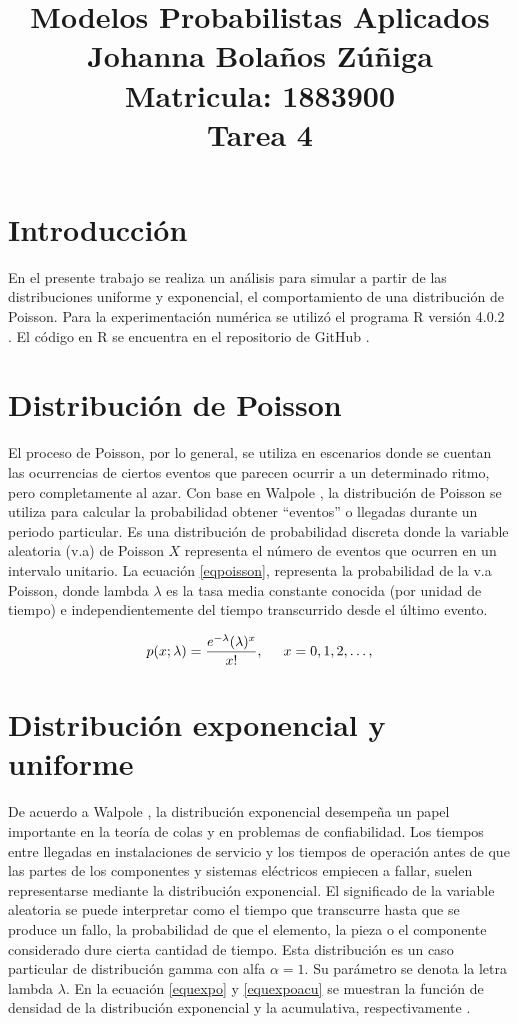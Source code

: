 \documentclass{article}
\title{
\centering
Modelos Probabilistas Aplicados \\
Johanna Bolaños Zúñiga \\
Matricula: 1883900\\
Tarea 4
}
\date{}
\begin{document}
\maketitle

\section{Introducción}
En el presente trabajo se realiza un análisis para simular a partir de las distribuciones uniforme y exponencial, el comportamiento de una distribución de Poisson. Para la experimentación numérica se utilizó el programa R versión 4.0.2 \cite{r}. El código en R se encuentra en el repositorio de GitHub \cite{github}.

\section{Distribución de Poisson} \label{poisson}
El proceso de Poisson, por lo general, se utiliza en escenarios donde se cuentan las ocurrencias de ciertos eventos que parecen ocurrir a un determinado ritmo, pero completamente al azar. Con base en Walpole \cite{walpole}, la distribución de Poisson se utiliza para calcular la probabilidad obtener ``eventos” o llegadas durante un periodo particular. Es una distribución de probabilidad discreta donde la variable aleatoria (v.a) de Poisson $X$ representa el número de eventos que ocurren en un intervalo unitario. La ecuación \ref{eqpoisson}, representa la probabilidad de la v.a Poisson, donde lambda $\lambda$ es la tasa media constante conocida (por unidad de tiempo) e independientemente del tiempo transcurrido desde el último evento.


\begin{equation} \label{eqpoisson}
p(x;\lambda)=\frac{e^{-\lambda}(\lambda)^x}{x!}, \hspace{0,5cm}x=0, 1, 2, \dots,
\end{equation}

\section{Distribución exponencial y uniforme} \label{expunif}

De acuerdo a Walpole \cite{walpole}, la distribución exponencial desempeña un papel importante en la teoría de colas y en problemas de confiabilidad. Los tiempos entre llegadas en instalaciones de servicio y los tiempos de operación antes de que las partes de los componentes y sistemas eléctricos empiecen a fallar, suelen representarse mediante la distribución exponencial. El significado de la variable aleatoria se puede interpretar como el tiempo que transcurre hasta que se produce un fallo, la probabilidad de que el elemento, la pieza o el componente considerado dure cierta cantidad de tiempo. Esta distribución es un caso particular de distribución gamma con alfa $\alpha = 1$. Su parámetro se denota la letra lambda $\lambda$. En la ecuación \ref{equexpo} y \ref{equexpoacu} se muestran la función de densidad de la distribución exponencial y la acumulativa, respectivamente \cite{notasElisa}.
\end{document}
